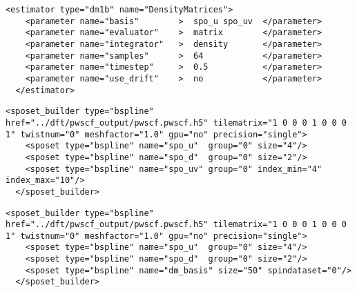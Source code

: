 \begin{lstlisting}[style=QMCPXML,caption=One body density matrix with density sampling.]
  <estimator type="dm1b" name="DensityMatrices">
    <parameter name="basis"        >  spo_u spo_uv  </parameter>
    <parameter name="evaluator"    >  matrix        </parameter>
    <parameter name="integrator"   >  density       </parameter>
    <parameter name="samples"      >  64            </parameter>
    <parameter name="timestep"     >  0.5           </parameter>
    <parameter name="use_drift"    >  no            </parameter>
  </estimator>
\end{lstlisting}


\begin{lstlisting}[style=QMCPXML,caption={Example \texttt{sposet} initialization for density matrix use.  Occupied and virtual orbital sets are created separately, then joined (\texttt{basis="spo\_u spo\_uv"}).}]
  <sposet_builder type="bspline" href="../dft/pwscf_output/pwscf.pwscf.h5" tilematrix="1 0 0 0 1 0 0 0 1" twistnum="0" meshfactor="1.0" gpu="no" precision="single">
    <sposet type="bspline" name="spo_u"  group="0" size="4"/>
    <sposet type="bspline" name="spo_d"  group="0" size="2"/>
    <sposet type="bspline" name="spo_uv" group="0" index_min="4" index_max="10"/>
  </sposet_builder>
\end{lstlisting}


\begin{lstlisting}[style=QMCPXML,caption={Example \texttt{sposet} initialization for density matrix use.  Density matrix orbital basis created separately (\texttt{basis="dm\_basis"}).}]
  <sposet_builder type="bspline" href="../dft/pwscf_output/pwscf.pwscf.h5" tilematrix="1 0 0 0 1 0 0 0 1" twistnum="0" meshfactor="1.0" gpu="no" precision="single">
    <sposet type="bspline" name="spo_u"  group="0" size="4"/>
    <sposet type="bspline" name="spo_d"  group="0" size="2"/>
    <sposet type="bspline" name="dm_basis" size="50" spindataset="0"/>
  </sposet_builder>
\end{lstlisting}



